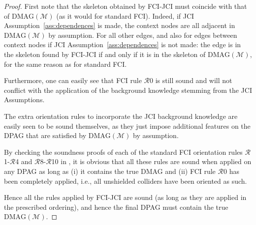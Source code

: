 \documentclass[twoside,11pt]{article}
\newcommand\C[1]{\mathcal{#1}}
\newcommand{\ttt}{\relbar\!\!\!\relbar}
\newcommand{\ttc}{\relbar\!\!\!\relbar\mkern-9mu\circ\,}
\newcommand{\DMAG}{\mathrm{DMAG}}
\begin{document}
\begin{proof}
  First note that the skeleton obtained by FCI-JCI must coincide with that of $\DMAG(\C{M})$ (as it would for standard FCI). 
  Indeed, if JCI Assumption~\ref{ass:dependences} is made, the context nodes are all adjacent in $\DMAG(\C{M})$ by assumption. 
  For all other edges, and also for edges between context nodes if JCI Assumption~\ref{ass:dependences} is not made: the edge is in the skeleton found by FCI-JCI if and only if it is in the skeleton of $\DMAG(\C{M})$, for the same reason as for standard FCI.

  Furthermore, one can easily see that FCI rule $\C{R}$0 is still sound and will not conflict with the application of the background knowledge stemming from the JCI Assumptions. 

  The extra orientation rules to incorporate the JCI background knowledge are easily seen to be sound themselves, as they just impose additional features on the DPAG that are satisfied by $\DMAG(\C{M})$ by assumption.

  By checking the soundness proofs of each of the standard FCI orientation rules $\C{R}$1-$\C{R}$4 and $\C{R}$8-$\C{R}$10 in \citet{Zhang2006}, it is obvious that all these rules are sound when applied on any DPAG as long as (i) it contains the true DMAG and (ii) FCI rule $\C{R}0$ has been completely applied, i.e., all unshielded colliders have been oriented as such.

  Hence all the rules applied by FCI-JCI are sound (as long as they are applied in the prescribed ordering), and hence the final DPAG must contain the true $\DMAG(\C{M})$.
\end{proof}
\end{document}

